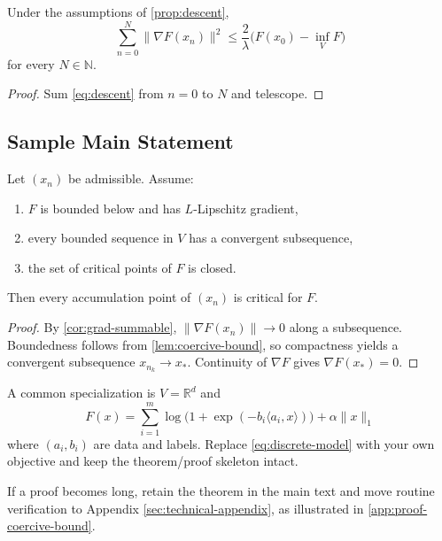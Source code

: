 \begin{corollary}
\label{cor:grad-summable}
Under the assumptions of \cref{prop:descent},
\[
\sum_{n=0}^{N}\|\nabla F(x_n)\|^2
\le \frac{2}{\lambda}\bigl(F(x_0)-\inf_V F\bigr)
\]
for every $N\in\mathbb{N}$.
\end{corollary}

\begin{proof}
Sum \cref{eq:descent} from $n=0$ to $N$ and telescope.
\end{proof}

\subsection{Sample Main Statement}
\label{ssec:main-statement}

\begin{theorem}
\label{thm:template-convergence}
Let $(x_n)$ be admissible. Assume:
\begin{enumerate}
    \item $F$ is bounded below and has $L$-Lipschitz gradient,
    \item every bounded sequence in $V$ has a convergent subsequence,
    \item the set of critical points of $F$ is closed.
\end{enumerate}
Then every accumulation point of $(x_n)$ is critical for $F$.
\end{theorem}

\begin{proof}
By \cref{cor:grad-summable}, $\|\nabla F(x_n)\|\to 0$ along a subsequence. Boundedness follows from \cref{lem:coercive-bound}, so compactness yields a convergent subsequence $x_{n_k}\to x_\ast$. Continuity of $\nabla F$ gives $\nabla F(x_\ast)=0$.
\end{proof}

\begin{example}
\label{ex:discrete-model}
A common specialization is $V=\mathbb{R}^d$ and
\begin{equation}
\label{eq:discrete-model}
F(x)=\sum_{i=1}^{m}\log\bigl(1+\exp(-b_i\langle a_i,x\rangle)\bigr)+\alpha\|x\|_1
\end{equation}
where $(a_i,b_i)$ are data and labels. Replace \cref{eq:discrete-model} with your own objective and keep the theorem/proof skeleton intact.
\end{example}

\begin{remark}
\label{rem:appendix-ref}
If a proof becomes long, retain the theorem in the main text and move routine verification to Appendix \ref{sec:technical-appendix}, as illustrated in \cref{app:proof-coercive-bound}.
\end{remark}

